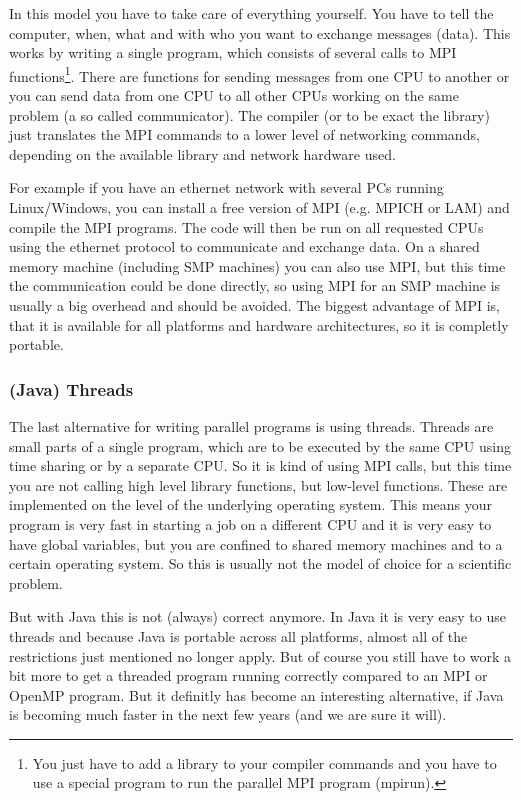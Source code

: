 In this model you have to 
take care of everything yourself. You have to tell the computer, when, what and 
with who you want to exchange messages (data). This works by writing a single
program, which consists of several calls to MPI functions\footnote{You just have
to add a library to your compiler commands and you have to use a special program
to run the parallel MPI program (mpirun).}. There are functions for
sending messages from one CPU to another or you can send data from one CPU to
all other CPUs working on the same problem (a so called communicator).
The compiler (or to be  exact the library) just translates the MPI commands
to a lower level of networking commands, depending on the available library and
network hardware used. 

For example if you have an ethernet network with
several PCs running Linux/Windows, you can install a free version of MPI
(e.g. MPICH or LAM) and compile the MPI programs. The code will then be run on all
requested CPUs using the ethernet protocol to communicate and exchange data.
On a shared memory machine (including SMP machines) 
you can also use MPI, but this time the communication could
be done directly, so using MPI for an SMP machine is usually a big overhead
and should be avoided. The biggest advantage of MPI is, that it is available
for all platforms and hardware architectures, so it is completly portable.

\subsubsection{(Java) Threads}
The last alternative for writing parallel programs is using threads. Threads are small
parts of a single program, which are to be executed by the same CPU using
time sharing or by a separate CPU. 
So it is kind of using MPI calls, but this time you are not calling
high level library functions, but low-level functions.
These are implemented on the level of the underlying operating system.
This means your program is very fast in starting a job on a different CPU
and it is very easy to have global variables, but you are confined to
shared memory machines and to a certain operating system. So this is usually
not the model of choice for a scientific problem. 

But with Java this is
not (always) correct anymore. In Java it is very easy to use threads and
because Java is portable across all platforms, almost all of 
the restrictions just mentioned no longer apply. 
But of course you still have to work a bit more to get a threaded
program running correctly compared to an MPI or OpenMP program. But it 
definitly has become an interesting alternative, if Java is becoming much
faster in the next few years (and we are sure it will).

